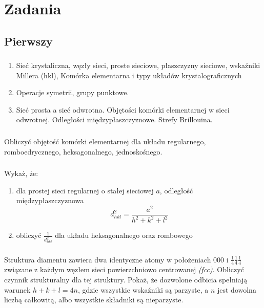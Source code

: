 \section{Zadania}
\subsection{Pierwszy}
\subsubsection{}
\begin{enumerate}
\item Sieć  krystaliczna, węzły sieci, proste sieciowe, płaszczyzny sieciowe, wskaźniki Millera (hkl), Komórka elementarna i  typy układów krystalograficznych
\item Operacje symetrii, grupy punktowe.
\item Sieć prosta a sieć odwrotna. Objętości komórki elementarnej w sieci odwrotnej. Odległości międzypłaszczyznowe. Strefy Brillouina.
\end{enumerate}

\subsubsection{}
Obliczyć objętość komórki elementarnej dla układu regularnego, romboedrycznego, heksagonalnego, jednoskośnego.
\subsubsection{}
Wykaż, że:
\begin{enumerate}
\item dla prostej sieci regularnej o stałej sieciowej $a$, odległość międzypłaszczyznowa \[d^2_{hkl} =\frac{a^2}{h^2+k^2+l^2}\] 
\item obliczyć $\frac{1}{d^2_{hkl}}$ dla układu heksagonalnego oraz rombowego
\end{enumerate}

\subsubsection{}
Struktura diamentu zawiera dwa identyczne atomy w położeniach $000$ i $\frac{1}{4}\frac{1}{4}\frac{1}{4}$ związane z każdym węzłem sieci powierzchniowo centrowanej \textit{(fcc)}. Obliczyć czynnik strukturalny dla tej struktury. Pokaż, że dozwolone odbicia spełniają warunek $h + k + l = 4n$, gdzie wszystkie wskaźniki są parzyste, a $n$ jest dowolna liczbą całkowitą, albo wszystkie składniki są nieparzyste.  

